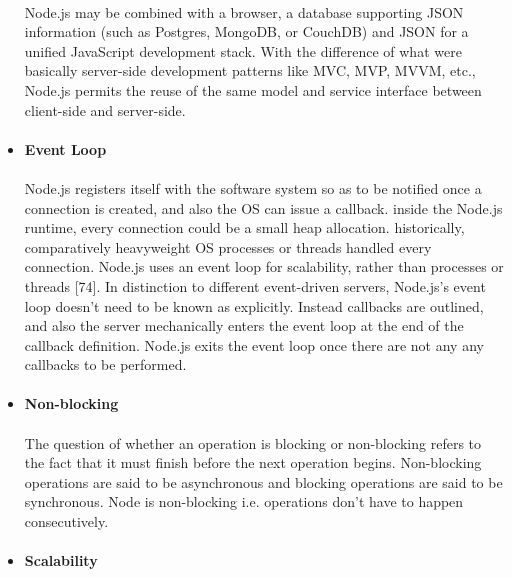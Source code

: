 \documentclass[a4paper, onecolumn, oneside, 11pt, wide, floatssmall]{mwrep}
\begin{document}
\begin{itemize}
    \paragraph{}
    Node.js may be combined with a browser, a database supporting JSON information (such as Postgres, MongoDB, or CouchDB) and JSON for a unified JavaScript development stack. With the difference of what were basically server-side development patterns like MVC, MVP, MVVM, etc., Node.js permits the reuse of the same model and service interface between client-side and server-side.
    \paragraph{}
    \item \textbf{Event Loop}
    \paragraph{}
    Node.js registers itself with the software system so as to be notified once a connection is created, and also the OS can issue a callback. inside the Node.js runtime, every connection could be a small heap allocation. historically, comparatively heavyweight OS processes or threads handled every connection. Node.js uses an event loop for scalability, rather than processes or threads [74]. In distinction to different event-driven servers, Node.js's event loop doesn't need to be known as explicitly. Instead callbacks are outlined, and also the server mechanically enters the event loop at the end of the callback definition. Node.js exits the event loop once there are not any any callbacks to be performed.
    \paragraph{}
    \item \textbf{Non-blocking}
    \paragraph{}
    The question of whether an operation is blocking or non-blocking refers to the fact that it must finish before the next operation begins. Non-blocking operations are said to be asynchronous and blocking operations are said to be synchronous. Node is non-blocking i.e. operations don't have to happen consecutively.
    \paragraph{}
    \item \textbf{Scalability}

\end{itemize}
\end{document}
